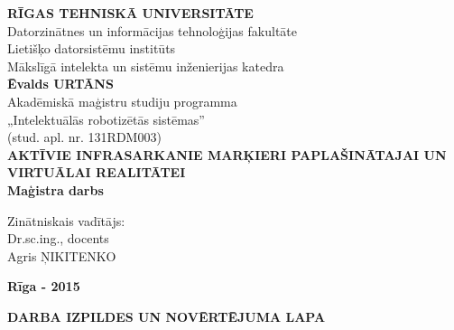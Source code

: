 \documentclass[12pt, a4paper, oneside, openright]{article}
\begin{document}
\selectfont
\begin{titlepage}

	\begin{center}
	
	{\fontsize{16}{16}\selectfont
	\textbf{RĪGAS TEHNISKĀ UNIVERSITĀTE}\\
	Datorzinātnes un informācijas tehnoloģijas fakultāte\\
	Lietišķo datorsistēmu institūts \\
	Mākslīgā intelekta un sistēmu inženierijas katedra}\\[3cm]

	\normalsize{
	\textbf{Ēvalds URTĀNS}\\
		Akadēmiskā maģistru studiju programma\\„Intelektuālās robotizētās sistēmas”\\
		(stud. apl. nr. 131RDM003)
	}\\[3.5cm]

	{ \fontsize{16}{16}\selectfont \textbf{AKTĪVIE INFRASARKANIE MARĶIERI PAPLAŠINĀTAJAI UN VIRTUĀLAI REALITĀTEI}}\\[0.4cm]


	\textbf{\normalsize Maģistra darbs}\\[5cm]

	\begin{flushright} 
	Zinātniskais vadītājs: \\
	Dr.sc.ing., docents\\ 
	Agris ŅIKITENKO\\
	\end{flushright}
	\vspace{3.0cm}


	{\fontsize{16}{16}\selectfont
	\textbf{Rīga - 2015}}

	\end{center}

\end{titlepage}

\thispagestyle{empty}
\newpage

\begin{center}	
	{\fontsize{14}{14}\selectfont
	\textbf{DARBA IZPILDES UN NOVĒRTĒJUMA LAPA}\\
	}
\end{center}	
	\vspace{\baselineskip}
	
\end{document}
